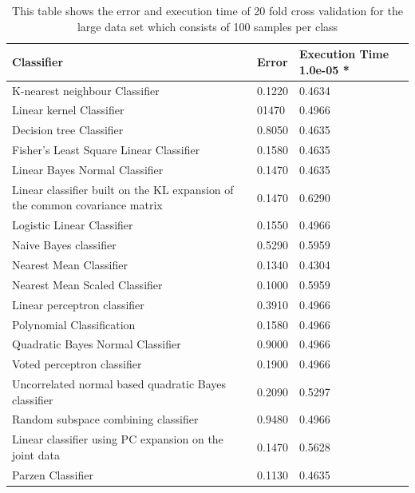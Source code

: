 \documentclass[%
        compressed,
        final,
        notitlepage,
        narroweqnarray,
        inline,
        twoside,
        ]{ieee}
\begin{document}
\begin{table}
    \begin{tabular} {p{5cm}lp{1.5cm}} %
        \hline
    Classifier & Error & Execution Time 1.0e-05 * \\
        \hline
K-nearest neighbour Classifier & 0.1220 & 0.4634 \\
Linear kernel Classifier & 01470 & 0.4966 \\
Decision tree Classifier & 0.8050 & 0.4635 \\
Fisher's Least Square Linear Classifier & 0.1580 & 0.4635 \\
Linear Bayes Normal Classifier & 0.1470 & 0.4635 \\
Linear classifier built on the KL expansion of the common covariance matrix & 0.1470 & 0.6290 \\
Logistic Linear Classifier & 0.1550 & 0.4966 \\
Naive Bayes classifier & 0.5290 & 0.5959 \\
Nearest Mean Classifier & 0.1340 & 0.4304 \\
Nearest Mean Scaled Classifier & 0.1000 & 0.5959 \\
Linear perceptron classifier & 0.3910 & 0.4966 \\
Polynomial Classification & 0.1580 & 0.4966 \\
Quadratic Bayes Normal Classifier & 0.9000 & 0.4966 \\
Voted perceptron classifier & 0.1900 & 0.4966 \\
Uncorrelated normal based quadratic Bayes classifier & 0.2090 & 0.5297 \\
Random subspace combining classifier & 0.9480 & 0.4966 \\
Linear classifier using PC expansion on the joint data & 0.1470 & 0.5628 \\
Parzen Classifier & 0.1130 & 0.4635 \\
        \hline
    \end{tabular}
    \caption{
        This table shows the error and execution time of 20 fold cross
        validation for the large data set which consists of 100
        samples per class }
\end{table}
\end{document}
